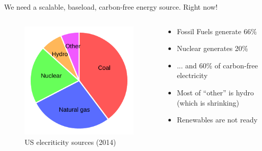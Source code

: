 \documentclass{beamer}
\begin{document}
        \begin{frame}{We need a scalable, baseload, carbon-free energy source.  Right now!}

            \begin{columns}[T]

                \begin{column}{0.5\textwidth}
                    \begin{figure}
                        \centering
                        \includegraphics[width=\textwidth]{./img/sources.pdf}
                        \caption*{US elecriticity sources (2014)}
                    \end{figure}
                \end{column}

                \begin{column}{0.5\textwidth}
                    \begin{itemize}
                        \item Fossil Fuels generate 66\%
                        \pause
                        \item Nuclear generates 20\%
                        \pause
                        \item ... and 60\% of carbon-free electricity
                        \pause
                        \item Most of ``other'' is hydro \\ (which is shrinking)
                        \pause
                        \item Renewables are not ready
                    \end{itemize}
                \end{column}

            \end{columns}

        \end{frame}
\end{document}
